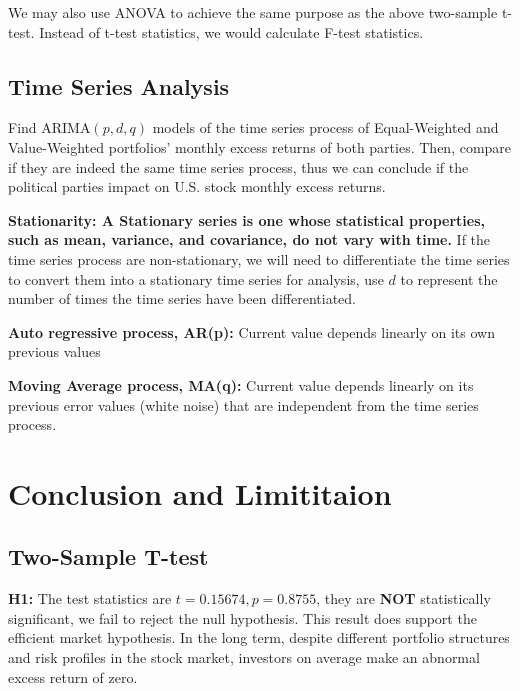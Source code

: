\documentclass[a4paper]{article}
\begin{document}
\hspace{12pt} We may also use ANOVA to achieve the same purpose as the above two-sample t-test. Instead of t-test statistics, we would calculate F-test statistics. 

\vspace{-10pt}
\subsection{Time Series Analysis}
\vspace{-10pt}
\hspace{12pt} Find ARIMA$(p, d, q)$ models of the time series process of Equal-Weighted and Value-Weighted portfolios' monthly excess returns of both parties. Then, compare if they are indeed the same time series process, thus we can conclude if the political parties impact on U.S. stock monthly excess returns. 

\textbf{Stationarity: A Stationary series is one whose statistical properties, such as mean, variance, and covariance, do not vary with time.} If the time series process are non-stationary, we will need to differentiate the time series to convert them into a stationary time series for analysis, use $d$ to represent the number of times the time series have been differentiated. 

\textbf{Auto regressive process, AR(p):} Current value depends linearly on its own previous values


\textbf{Moving Average process, MA(q):} Current value depends linearly on its previous error values (white noise) that are independent from the time series process. 



\section{Conclusion and Limititaion} \label{Conclusion}

\vspace{-10pt}
\subsection{Two-Sample T-test}\label{Results}
\vspace{-10pt}
\hspace{12pt}
    \textbf{H1:} The test statistics are $t = 0.15674, p = 0.8755$, they are \textbf{NOT} statistically significant, we fail to reject the null hypothesis. This result does support the efficient market hypothesis. In the long term, despite different portfolio structures and risk profiles in the stock market, investors on average make an abnormal excess return of zero. 
\end{document}
